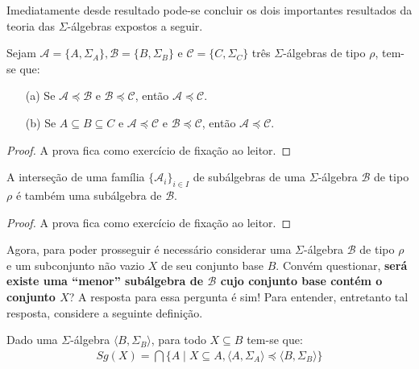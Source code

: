 Imediatamente desde resultado pode-se concluir os dois importantes resultados da teoria das $\Sigma$-álgebras expostos a seguir.

\begin{corolario}
  Sejam $\mathcal{A} = \{A, \Sigma_A\}, \mathcal{B} = \{B, \Sigma_B\}$ e $\mathcal{C} = \{C, \Sigma_C\}$ três $\Sigma$-álgebras de tipo $\rho$, tem-se que:
  \begin{itemize}
    \item[(a)] Se $\mathcal{A} \preccurlyeq  \mathcal{B}$ e $\mathcal{B} \preccurlyeq  \mathcal{C}$, então $\mathcal{A} \preccurlyeq  \mathcal{C}$.
    \item[(b)] Se $A \subseteq B \subseteq C$ e $\mathcal{A} \preccurlyeq  \mathcal{C}$ e $\mathcal{B} \preccurlyeq  \mathcal{C}$, então $\mathcal{A} \preccurlyeq  \mathcal{C}$.
  \end{itemize}
\end{corolario}

\begin{proof}
  A prova fica como exercício de fixação ao leitor.
\end{proof}

\begin{corolario}
  A interseção de uma família $\{\mathcal{A}_i\}_{i \in I}$ de subálgebras de uma $\Sigma$-álgebra $\mathcal{B}$ de tipo $\rho$ é também uma subálgebra de $\mathcal{B}$.
\end{corolario}

\begin{proof}
  A prova fica como exercício de fixação ao leitor.
\end{proof}

Agora, para poder prosseguir é necessário considerar uma $\Sigma$-álgebra $\mathcal{B}$ de tipo $\rho$ e um subconjunto não vazio $X$ de seu conjunto base $B$. Convém questionar, \textbf{será existe uma ``menor'' subálgebra de $\mathcal{B}$ cujo conjunto base contém o conjunto $X$}? A resposta para essa pergunta é sim! Para entender, entretanto tal resposta, considere a seguinte definição.

\begin{definicao}
  Dado uma $\Sigma$-álgebra $\langle B, \Sigma_B \rangle$, para todo $X \subseteq B$ tem-se que:
  \begin{eqnarray*}
    Sg(X) = \bigcap \{ A \mid X \subseteq A, \langle A, \Sigma_A \rangle \preccurlyeq  \langle B, \Sigma_B \rangle \}
  \end{eqnarray*}
\end{definicao}
